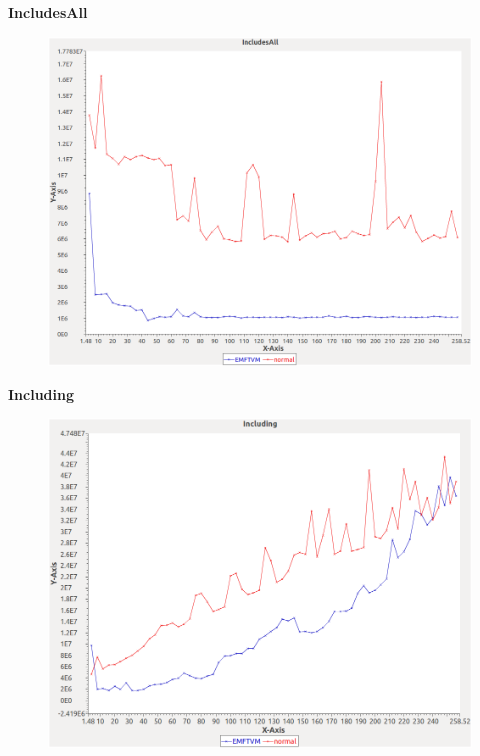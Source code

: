 \noindent\textbf{IncludesAll}

\begin{figure}[h]
\centering
\includegraphics[width=\textwidth]{graphs/bag/IncludesAll}
\end{figure}
\pagebreak

\noindent\textbf{Including}

\begin{figure}[h]
\centering
\includegraphics[width=\textwidth]{graphs/bag/Including}
\end{figure}
\pagebreak


